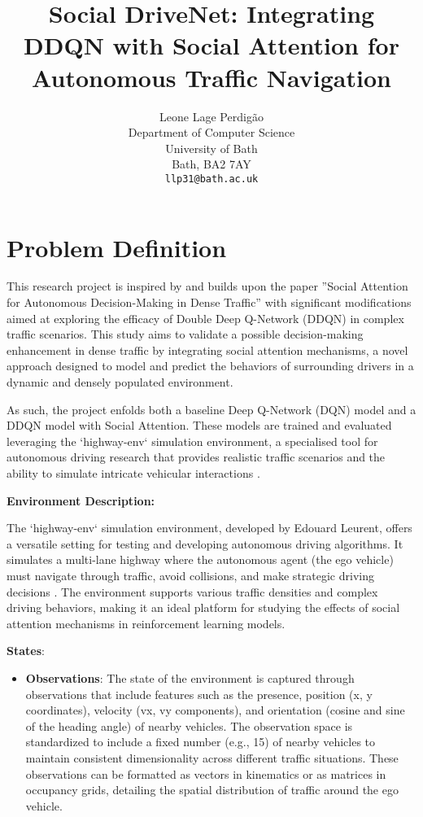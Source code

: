 \documentclass{article}
\title{Social DriveNet: Integrating DDQN with Social Attention for Autonomous Traffic Navigation}
\author{
  Leone Lage Perdigão
  \\
  Department of Computer Science\\
  University of Bath\\
  Bath, BA2 7AY \\
  \texttt{llp31@bath.ac.uk} \\
}
\begin{document}
\maketitle

\section{Problem Definition}

This research project is inspired by and builds upon the paper ''Social Attention for Autonomous Decision-Making in Dense Traffic'' \cite{leurent2019social} with significant modifications aimed at exploring the efficacy of Double Deep Q-Network (DDQN) in complex traffic scenarios. This study aims to validate a possible decision-making enhancement in dense traffic by integrating social attention mechanisms, a novel approach designed to model and predict the behaviors of surrounding drivers in a dynamic and densely populated environment.

As such, the project enfolds both a baseline Deep Q-Network (DQN) model and a DDQN model with Social Attention. These models are trained and evaluated leveraging the `highway-env` simulation environment, a specialised tool for autonomous driving research that provides realistic traffic scenarios and the ability to simulate intricate vehicular interactions \cite{highway-env}.

\textbf{Environment Description:}
\par The `highway-env` simulation environment, developed by Edouard Leurent, offers a versatile setting for testing and developing autonomous driving algorithms. It simulates a multi-lane highway where the autonomous agent (the ego vehicle) must navigate through traffic, avoid collisions, and make strategic driving decisions \cite{highway-env}. The environment supports various traffic densities and complex driving behaviors, making it an ideal platform for studying the effects of social attention mechanisms in reinforcement learning models.

\textbf{States}:
\begin{itemize}
  \item \textbf{Observations}: The state of the environment is captured through observations that include features such as the presence, position (x, y coordinates), velocity (vx, vy components), and orientation (cosine and sine of the heading angle) of nearby vehicles. The observation space is standardized to include a fixed number (e.g., 15) of nearby vehicles to maintain consistent dimensionality across different traffic situations. These observations can be formatted as vectors in kinematics or as matrices in occupancy grids, detailing the spatial distribution of traffic around the ego vehicle.
\end{itemize}
\end{document}
